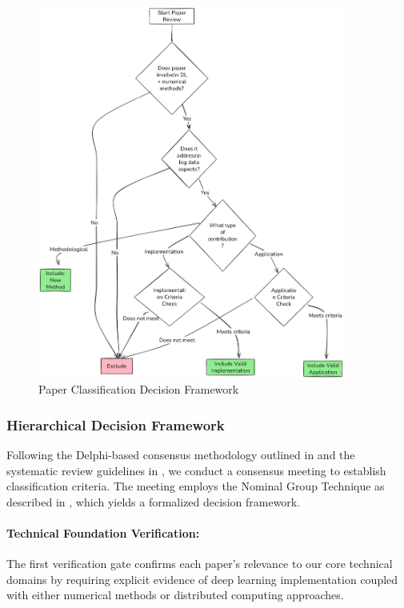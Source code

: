 \documentclass[acmsmall]{acmart}
\begin{document}
\begin{figure}
    \centering
    \includegraphics[width=0.9\textwidth]{media/Company Structure.png}
    \caption{Paper Classification Decision Framework}
    \label{fig:decision-flow2}
\end{figure}

\subsubsection{Hierarchical Decision Framework}\label{subsubsec:phase-2-literature-search-and-study-selection:hierarchical-decision-framework}
Following the Delphi-based consensus methodology outlined in \citet{dalkey1969delphi} and the systematic review guidelines in  \citet{kitchenham2004procedures}, we conduct a  consensus meeting to establish classification criteria. The meeting employs the Nominal Group Technique as described in \citet{delbecq1971group}, which yields a formalized decision framework.

\paragraph{Technical Foundation Verification:}
The first verification gate confirms each paper's relevance to our core technical domains by requiring explicit evidence of deep learning implementation coupled with either numerical methods or distributed computing approaches.
\end{document}
